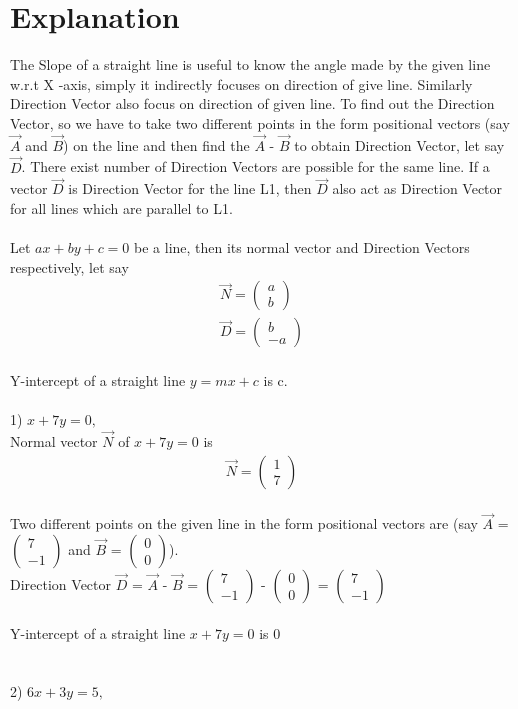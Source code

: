 \documentclass[journal,12pt,twocolumn]{IEEEtran}
\newcommand{\myvec}[1]{\ensuremath{\begin{pmatrix}#1\end{pmatrix}}}
\begin{document}
\section{Explanation}
The Slope of a straight line is useful to know the angle made by the given line w.r.t X -axis, simply it indirectly focuses on direction of give line. Similarly Direction Vector also focus on direction of given line. To find out the Direction Vector, so we have to take two different points in the form positional vectors (say $\vec{A}$ and $\vec{B}$) on the line and then find the $\vec{A}$ - $\vec{B}$ to obtain Direction Vector, let say $\vec{D}$. There exist number of Direction Vectors are possible for the same line. If a vector $\vec{D}$ is Direction Vector for the line L1, then $\vec{D}$ also act as Direction Vector for all lines which are parallel to L1.
\\
\\
Let $ ax+by+c=0 $ be a line, then its normal vector and Direction Vectors respectively, let say \begin{align}
	\vec{N} = \myvec{ a \\ b }\\
	\vec{D} = \myvec{ b \\ -a }
\end{align}
\\
Y-intercept of a straight line $ y = mx + c $ is c.
\\
\\
1) $ x  + 7y =  0,$
\\
Normal vector $\vec{N}$ of $ x  + 7y = 0 $ is   \begin{align}
	\vec{N} = \myvec{ 1 \\ 7 }
\end{align}
\\
	Two different points on the given line in the form positional vectors are (say $\vec{A}$ = \myvec{ 7 \\ -1 } and $\vec{B}$ = \myvec{ 0 \\ 0 }).\\
Direction Vector $\vec{D}$ = $\vec{A}$ - $\vec{B}$ = \myvec{ 7 \\ -1 } - \myvec{ 0 \\ 0 } = \myvec{ 7 \\ -1 }
\\
\\
Y-intercept of a straight line $ x  + 7y =  0 $ is 0
\\
\\
\\
2) $ 6x  + 3y =  5,$
\end{document}

